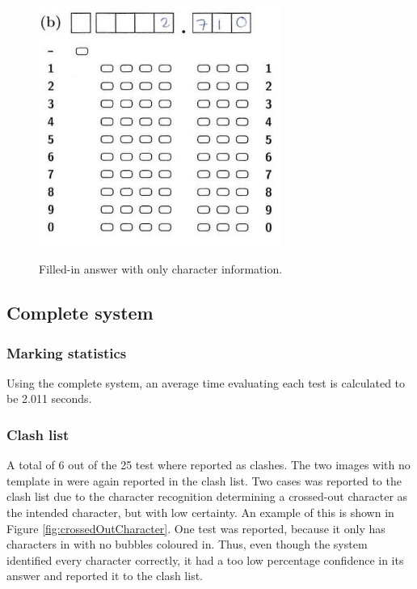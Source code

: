 \begin{figure}
  \centering
  \includegraphics[width=8cm]{OnlyCharacters}\\
  \caption{Filled-in answer with only character information.}
  \label{fig:OnlyCharacters}
\end{figure}

\subsection{Complete system}

\subsubsection{Marking statistics}

Using the complete system, an average time evaluating each test is calculated to be 2.011 seconds. 

\subsubsection{Clash list}

A total of 6 out of the 25 test where reported as clashes. The two images with no template in were again reported in the clash list. Two cases was reported to the clash list due to the character recognition determining a crossed-out character as the intended character, but with low certainty. An example of this is shown in Figure \ref{fig:crossedOutCharacter}. One test was reported, because it only has characters in with no bubbles coloured in. Thus, even though the system identified every character correctly, it had a too low percentage confidence in its answer and reported it to the clash list. 

